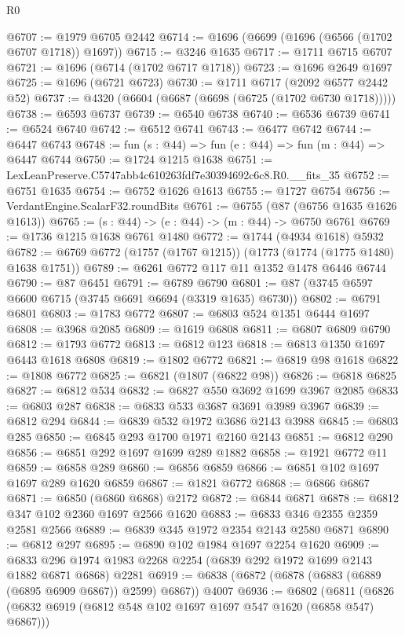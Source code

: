 \begin{lexlean}{R0}
\begin{coremodule}
@6707 := @1979 @6705 @2442
@6714 := @1696 (@6699 (@1696 (@6566 (@1702 @6707 @1718)) @1697))
@6715 := @3246 @1635
@6717 := @1711 @6715 @6707
@6721 := @1696 (@6714 (@1702 @6717 @1718))
@6723 := @1696 @2649 @1697
@6725 := @1696 (@6721 @6723)
@6730 := @1711 @6717 (@2092 @6577 @2442 @52)
@6737 := @4320 (@6604 (@6687 (@6698 (@6725 (@1702 @6730 @1718)))))
@6738 := @6593 @6737
@6739 := @6540 @6738
@6740 := @6536 @6739
@6741 := @6524 @6740
@6742 := @6512 @6741
@6743 := @6477 @6742
@6744 := @6447 @6743
@6748 := fun (s : @44) => fun (e : @44) => fun (m : @44) => @6447 @6744
@6750 := @1724 @1215 @1638
@6751 := LexLeanPreserve.C5747abb4c610263fdf7e30394692c6c8.R0.__fits_35
@6752 := @6751 @1635
@6754 := @6752 @1626 @1613
@6755 := @1727 @6754
@6756 := VerdantEngine.ScalarF32.roundBits
@6761 := @6755 (@87 (@6756 @1635 @1626 @1613))
@6765 := (s : @44) -> (e : @44) -> (m : @44) -> @6750 @6761
@6769 := @1736 @1215 @1638 @6761 @1480
@6772 := @1744 (@4934 @1618) @5932
@6782 := @6769 @6772 (@1757 (@1767 @1215)) (@1773 (@1774 (@1775 @1480) @1638 @1751))
@6789 := @6261 @6772 @117 @11 @1352 @1478 @6446 @6744
@6790 := @87 @6451
@6791 := @6789 @6790
@6801 := @87 (@3745 @6597 @6600 @6715 (@3745 @6691 @6694 (@3319 @1635) @6730))
@6802 := @6791 @6801
@6803 := @1783 @6772
@6807 := @6803 @524 @1351 @6444 @1697
@6808 := @3968 @2085
@6809 := @1619 @6808
@6811 := @6807 @6809 @6790
@6812 := @1793 @6772
@6813 := @6812 @123
@6818 := @6813 @1350 @1697 @6443 @1618 @6808
@6819 := @1802 @6772
@6821 := @6819 @98 @1618
@6822 := @1808 @6772
@6825 := @6821 (@1807 (@6822 @98))
@6826 := @6818 @6825
@6827 := @6812 @534
@6832 := @6827 @550 @3692 @1699 @3967 @2085
@6833 := @6803 @287
@6838 := @6833 @533 @3687 @3691 @3989 @3967
@6839 := @6812 @294
@6844 := @6839 @532 @1972 @3686 @2143 @3988
@6845 := @6803 @285
@6850 := @6845 @293 @1700 @1971 @2160 @2143
@6851 := @6812 @290
@6856 := @6851 @292 @1697 @1699 @289 @1882
@6858 := @1921 @6772 @11
@6859 := @6858 @289
@6860 := @6856 @6859
@6866 := @6851 @102 @1697 @1697 @289 @1620 @6859
@6867 := @1821 @6772
@6868 := @6866 @6867
@6871 := @6850 (@6860 @6868) @2172
@6872 := @6844 @6871
@6878 := @6812 @347 @102 @2360 @1697 @2566 @1620
@6883 := @6833 @346 @2355 @2359 @2581 @2566
@6889 := @6839 @345 @1972 @2354 @2143 @2580 @6871
@6890 := @6812 @297
@6895 := @6890 @102 @1984 @1697 @2254 @1620
@6909 := @6833 @296 @1974 @1983 @2268 @2254 (@6839 @292 @1972 @1699 @2143 @1882 @6871 @6868) @2281
@6919 := @6838 (@6872 (@6878 (@6883 (@6889 (@6895 @6909 @6867)) @2599) @6867)) @4007
@6936 := @6802
    (@6811
      (@6826 (@6832 @6919 (@6812 @548 @102 @1697 @1697 @547 @1620 (@6858 @547) @6867)))

\end{coremodule}
\end{lexlean}
